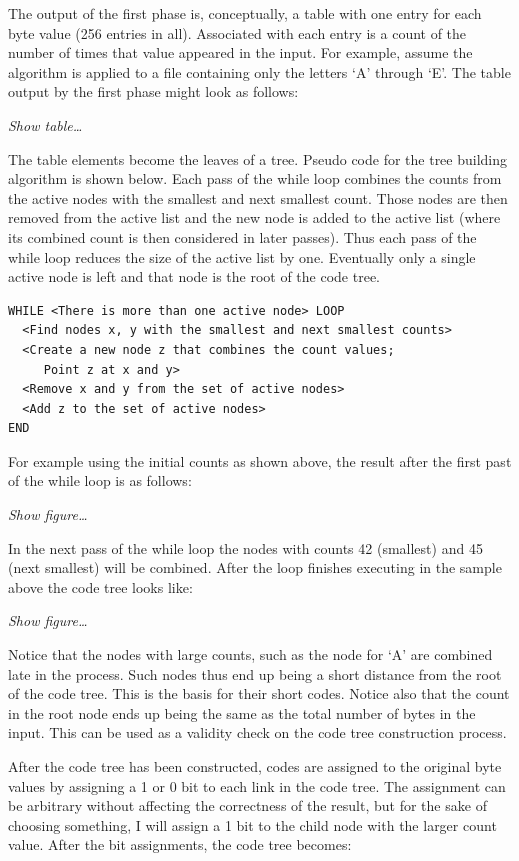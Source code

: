 \documentclass{scrreprt}
\begin{document}
The output of the first phase is, conceptually, a table with one entry for each byte value (256
entries in all). Associated with each entry is a count of the number of times that value
appeared in the input. For example, assume the algorithm is applied to a file containing only
the letters `A' through `E'. The table output by the first phase might look as follows:

\textit{Show table\ldots}

The table elements become the leaves of a tree. Pseudo code for the tree building algorithm is
shown below. Each pass of the while loop combines the counts from the active nodes with the
smallest and next smallest count. Those nodes are then removed from the active list and the new
node is added to the active list (where its combined count is then considered in later passes).
Thus each pass of the while loop reduces the size of the active list by one. Eventually only a
single active node is left and that node is the root of the code tree.

\begin{Verbatim}
WHILE <There is more than one active node> LOOP
  <Find nodes x, y with the smallest and next smallest counts>
  <Create a new node z that combines the count values;
     Point z at x and y>
  <Remove x and y from the set of active nodes>
  <Add z to the set of active nodes>
END
\end{Verbatim}

For example using the initial counts as shown above, the result after the first past of the
while loop is as follows:

\textit{Show figure\ldots}

In the next pass of the while loop the nodes with counts 42 (smallest) and 45 (next smallest)
will be combined. After the loop finishes executing in the sample above the code tree looks
like:

\textit{Show figure\ldots}

Notice that the nodes with large counts, such as the node for `A' are combined late in the
process. Such nodes thus end up being a short distance from the root of the code tree. This is
the basis for their short codes. Notice also that the count in the root node ends up being the
same as the total number of bytes in the input. This can be used as a validity check on the code
tree construction process.

After the code tree has been constructed, codes are assigned to the original byte values by
assigning a 1 or 0 bit to each link in the code tree. The assignment can be arbitrary without
affecting the correctness of the result, but for the sake of choosing something, I will assign a
1 bit to the child node with the larger count value.  After the bit assignments, the code tree
becomes:
\end{document}
